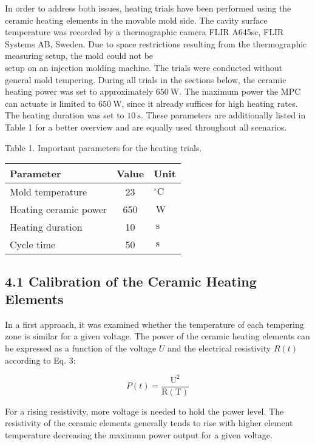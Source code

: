 \documentclass[10pt]{article}
\begin{document}
In order to address both issues, heating trials have been performed using the ceramic heating elements in the movable mold side. The cavity surface temperature was recorded by a thermographic camera FLIR A645sc, FLIR Systems AB, Sweden. Due to space restrictions resulting from the thermographic measuring setup, the mold could not be\\
setup on an injection molding machine. The trials were conducted without general mold tempering. During all trials in the sections below, the ceramic heating power was set to approximately $650 \mathrm{~W}$. The maximum power the MPC can actuate is limited to $650 \mathrm{~W}$, since it already suffices for high heating rates. The heating duration was set to $10 \mathrm{~s}$. These parameters are additionally listed in Table 1 for a better overview and are equally used throughout all scenarios.

Table 1. Important parameters for the heating trials.

\begin{center}
\begin{tabular}{l|c|l}
\hline
Parameter & Value & Unit \\
\hline
Mold temperature & 23 & ${ }^{\circ} \mathrm{C}$ \\
\hline
Heating ceramic power & 650 & $\mathrm{~W}$ \\
\hline
Heating duration & 10 & $\mathrm{~s}$ \\
\hline
Cycle time & 50 & $\mathrm{~s}$ \\
\hline
\end{tabular}
\end{center}

\subsection*{4.1 Calibration of the Ceramic Heating Elements}
In a first approach, it was examined whether the temperature of each tempering zone is similar for a given voltage. The power of the ceramic heating elements can be expressed as a function of the voltage $U$ and the electrical resistivity $R(t)$ according to Eq. 3:


\begin{equation*}
P(t)=\frac{\mathrm{U}^{2}}{\mathrm{R}(\mathrm{T})} \tag{3}
\end{equation*}


For a rising resistivity, more voltage is needed to hold the power level. The resistivity of the ceramic elements generally tends to rise with higher element temperature decreasing the maximum power output for a given voltage.
\end{document}
